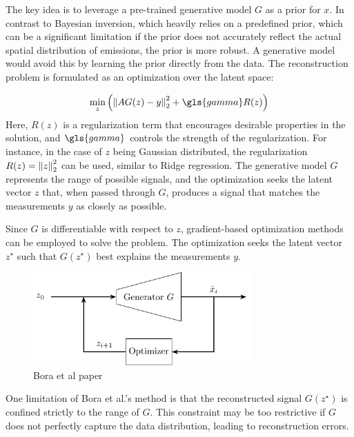 The key idea is to leverage a pre-trained generative model $G$ as a prior for $x$.
In contrast to Bayesian inversion, which heavily relies on a predefined prior, which can be a significant limitation if the prior does not accurately reflect the actual spatial distribution of emissions, the prior is more robust.
A generative model would avoid this by learning the prior directly from the data.
The reconstruction problem is formulated as an optimization over the latent space:

\begin{equation}
 \min_{z}{\left( \norm{A G(z) - y}_2^2 + \gls{gamma} R(z) \right)}
\end{equation}
Here, $R(z)$ is a regularization term that encourages desirable properties in the solution, and $\gls{gamma}$ controls the strength of the regularization.
For instance, in the case of $z$ being Gaussian distributed, the regularization $R(z) = \left\lVert z\right\rVert_2^2$ can be used, similar to Ridge regression.
The generative model $G$ represents the range of possible signals, and the optimization seeks the latent vector $z$ that, when passed through $G$, produces a signal that matches the measurements $y$ as closely as possible.

Since $G$ is differentiable with respect to $z$, gradient-based optimization methods can be employed to solve the problem.
The optimization seeks the latent vector $z^{\star}$ such that $G(z^{\star})$ best explains the measurements $y$.

\begin{figure}[h!]
    \centering
    \includegraphics[width=0.75\textwidth]{figures/02_related_work/latent_variable_optimization/build/latent_variable_optimization.pdf}
    \caption{Bora et al paper}
    \label{fig:gen_solver}
\end{figure}

One limitation of Bora et al.'s method is that the reconstructed signal $G(z^{\star})$ is confined strictly to the range of $G$.
This constraint may be too restrictive if $G$ does not perfectly capture the data distribution, leading to reconstruction errors.

